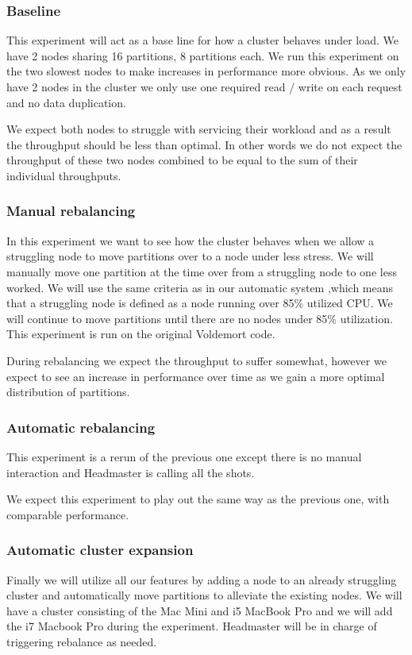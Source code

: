 \subsubsection{Baseline}
This experiment will act as a base line for how a cluster behaves under load. We have 2 nodes sharing 16 partitions, 8 partitions each. We run this experiment on the two slowest nodes to make increases in performance more obvious. As we only have 2 nodes in the cluster we only use one required read / write on each request and no data duplication.

We expect both nodes to struggle with servicing their workload and as a result the throughput should be less than optimal. In other words we do not expect the throughput of these two nodes combined to be equal to the sum of their individual throughputs. 

\subsubsection{Manual rebalancing}
In this experiment we want to see how the cluster behaves when we allow a struggling node to move partitions over to a node under less stress. We will manually move one partition at the time over from a struggling node to one less worked. We will use the same criteria as in our automatic system ,which means that a struggling node is defined as a node running over 85\% utilized CPU. We will continue to move partitions until there are no nodes under 85\% utilization. This experiment is run on the original Voldemort code. 

During rebalancing we expect the throughput to suffer somewhat, however we expect to see an increase in performance over time as we gain a more optimal distribution of partitions. 

\subsubsection{Automatic rebalancing}
This experiment is a rerun of the previous one except there is no manual interaction and Headmaster is calling all the shots.

We expect this experiment to play out the same way as the previous one, with comparable performance.

\subsubsection{Automatic cluster expansion}
Finally we will utilize all our features by adding a node to an already struggling cluster and automatically move partitions to alleviate the existing nodes. We will have a cluster consisting of the Mac Mini and i5 MacBook Pro and we will add the i7 Macbook Pro during the experiment. Headmaster will be in charge of triggering rebalance as needed. 


